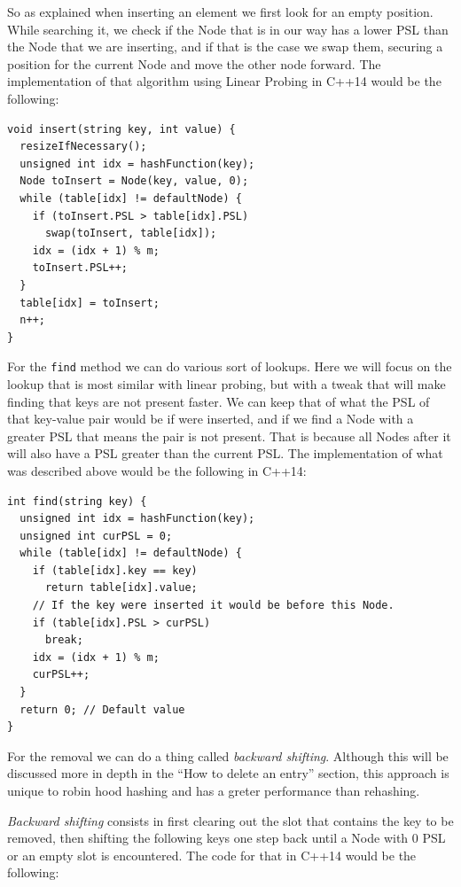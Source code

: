 So as explained when inserting an element we first look for an empty position. While searching it, we check if the Node that is in our way has a lower PSL than the Node that we are inserting, and if that is the case we swap them, securing a position for the current Node and move the other node forward. The implementation of that algorithm using Linear Probing in C++14 would be the following:

\begin{lstlisting}
void insert(string key, int value) {
  resizeIfNecessary();
  unsigned int idx = hashFunction(key);
  Node toInsert = Node(key, value, 0);
  while (table[idx] != defaultNode) {
    if (toInsert.PSL > table[idx].PSL)
      swap(toInsert, table[idx]);         
    idx = (idx + 1) % m;
    toInsert.PSL++;
  }
  table[idx] = toInsert;
  n++;
}
\end{lstlisting}

For the \texttt{find} method we can do various sort of lookups. Here we will focus on the lookup that is most similar with linear probing, but with a tweak that will make finding that keys are not present faster. We can keep that of what the PSL of that key-value pair would be if were inserted, and if we find a Node with a greater PSL that means the pair is not present. That is because all Nodes after it will also have a PSL greater than the current PSL. The implementation of what was described above would be the following in C++14:

\newpage

\begin{lstlisting}
int find(string key) {
  unsigned int idx = hashFunction(key);
  unsigned int curPSL = 0;
  while (table[idx] != defaultNode) {
    if (table[idx].key == key) 
      return table[idx].value;
    // If the key were inserted it would be before this Node.
    if (table[idx].PSL > curPSL)
      break; 
    idx = (idx + 1) % m;
    curPSL++;
  }
  return 0; // Default value
}
\end{lstlisting}

For the removal we can do a thing called \textit{backward shifting}. Although this will be discussed more in depth in the ``How to delete an entry'' section, this approach is unique to robin hood hashing and has a greter performance than rehashing.

\textit{Backward shifting} consists in first clearing out the slot that contains the key to be removed, then shifting the following keys one step back until a Node with 0 PSL or an empty slot is encountered. The code for that in C++14 would be the following:

